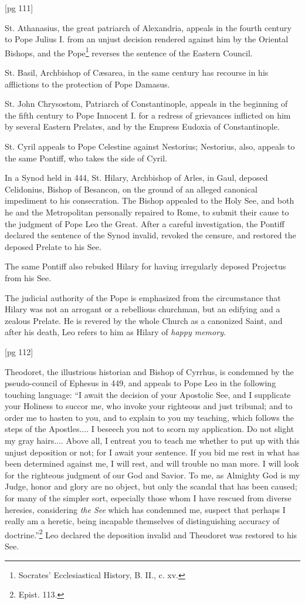 [pg 111]

St. Athanasius, the great patriarch of Alexandria,
appeals in the fourth century to Pope Julius
I. from an unjust decision rendered against him
by the Oriental Bishops, and the Pope\footnote{Socrates'
Ecclesiastical History, B. II., c. xv.} reverses the
sentence of the Eastern Council.

St. Basil, Archbishop of Cæsarea, in the same
century has recourse in his afflictions to the protection
of Pope Damasus.

St. John Chrysostom, Patriarch of Constantinople,
appeals in the beginning of the fifth century
to Pope Innocent I. for a redress of grievances inflicted
on him by several Eastern Prelates, and by
the Empress Eudoxia of Constantinople.

St. Cyril appeals to Pope Celestine against Nestorius;
Nestorius, also, appeals to the same Pontiff,
who takes the side of Cyril.

In a Synod held in 444, St. Hilary, Archbishop of
Arles, in Gaul, deposed Celidonius, Bishop of Besancon,
on the ground of an alleged canonical impediment
to his consecration. The Bishop appealed
to the Holy See, and both he and the Metropolitan
personally repaired to Rome, to submit
their cause to the judgment of Pope Leo the Great.
After a careful investigation, the Pontiff declared
the sentence of the Synod invalid, revoked the censure,
and restored the deposed Prelate to his See.

The same Pontiff also rebuked Hilary for having
irregularly deposed Projectus from his See.

The judicial authority of the Pope is emphasized
from the circumstance that Hilary was not an arrogant
or a rebellious churchman, but an edifying
and a zealous Prelate. He is revered by the whole
Church as a canonized Saint, and after his death,
Leo refers to him as Hilary of \emph{happy memory}.

[pg 112]

Theodoret, the illustrious historian and Bishop
of Cyrrhus, is condemned by the pseudo-council of
Ephesus in 449, and appeals to Pope Leo in the following
touching language: “I await the decision
of your Apostolic See, and I supplicate your Holiness
to succor me, who invoke your righteous and
just tribunal; and to order me to hasten to you,
and to explain to you my teaching, which follows
the steps of the Apostles.... I beseech you not
to scorn my application. Do not slight my gray
hairs.... Above all, I entreat you to teach me
whether to put up with this unjust deposition or
not; for I await your sentence. If you bid me
rest in what has been determined against me, I
will rest, and will trouble no man more. I will
look for the righteous judgment of our God and
Savior. To me, as Almighty God is my Judge,
honor and glory are no object, but only the scandal
that has been caused; for many of the simpler
sort, especially those whom I have rescued from
diverse heresies, considering \emph{the See} which has
condemned me, suspect that perhaps I really am a
heretic, being incapable themselves of distinguishing
accuracy of doctrine.”\footnote{Epist.
113.} Leo declared the
deposition invalid and Theodoret was restored to
his See.

